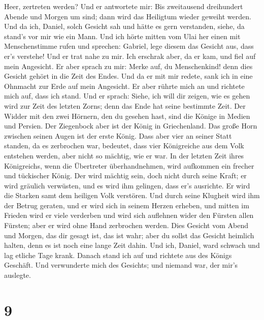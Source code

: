 Heer, zertreten werden?  Und er antwortete mir: Bis
zweitausend dreihundert Abende und Morgen um sind; dann wird das
Heiligtum wieder geweiht werden.  Und da ich, Daniel,
solch Gesicht sah und hätte es gern verstanden, siehe, da stand's vor
mir wie ein Mann.  Und ich hörte mitten vom Ulai her
einen mit Menschenstimme rufen und sprechen: Gabriel, lege diesem das
Gesicht aus, dass er's verstehe!  Und er trat nahe zu
mir. Ich erschrak aber, da er kam, und fiel auf mein Angesicht. Er aber
sprach zu mir: Merke auf, du Menschenkind! denn dies Gesicht gehört in
die Zeit des Endes.  Und da er mit mir redete, sank ich
in eine Ohnmacht zur Erde auf mein Angesicht. Er aber rührte mich an und
richtete mich auf, dass ich stand.  Und er sprach: Siehe,
ich will dir zeigen, wie es gehen wird zur Zeit des letzten Zorns; denn
das Ende hat seine bestimmte Zeit.  Der Widder mit den
zwei Hörnern, den du gesehen hast, sind die Könige in Medien und
Persien.  Der Ziegenbock aber ist der König in
Griechenland. Das große Horn zwischen seinen Augen ist der erste König.
 Dass aber vier an seiner Statt standen, da es zerbrochen
war, bedeutet, dass vier Königreiche aus dem Volk entstehen werden, aber
nicht so mächtig, wie er war.  In der letzten Zeit ihres
Königreichs, wenn die Übertreter überhandnehmen, wird aufkommen ein
frecher und tückischer König.  Der wird mächtig sein,
doch nicht durch seine Kraft; er wird gräulich verwüsten, und es wird
ihm gelingen, dass er's ausrichte. Er wird die Starken samt dem heiligen
Volk verstören.  Und durch seine Klugheit wird ihm der
Betrug geraten, und er wird sich in seinem Herzen erheben, und mitten im
Frieden wird er viele verderben und wird sich auflehnen wider den
Fürsten allen Fürsten; aber er wird ohne Hand zerbrochen werden.
 Dies Gesicht vom Abend und Morgen, das dir gesagt ist,
das ist wahr; aber du sollst das Gesicht heimlich halten, denn es ist
noch eine lange Zeit dahin.  Und ich, Daniel, ward
schwach und lag etliche Tage krank. Danach stand ich auf und richtete
aus des Königs Geschäft. Und verwunderte mich des Gesichts; und niemand
war, der mir's auslegte.

\hypertarget{section-8}{%
\section{9}\label{section-8}}

